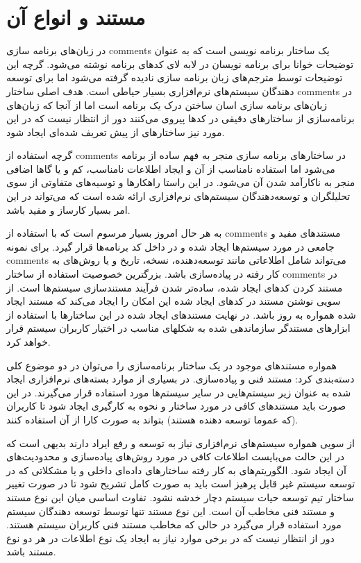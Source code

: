 
\section{مستند و انواع آن}

در زبان‌های برنامه سازی \glspl{comment} یک ساختار برنامه نویسی است که به عنوان
توضیحات خوانا برای برنامه نویسان در لابه لای کدهای برنامه نوشته می‌شود. گرچه این
توضیحات توسط مترجم‌های زبان برنامه سازی نادیده گرفته می‌شود اما برای توسعه
دهندگان سیستم‌های نرم‌افزاری بسیار حیاطی است. هدف اصلی ساختار \glspl{comment} در
زبان‌های برنامه سازی اسان ساختن درک یک برنامه است اما از آنجا که زبان‌های
برنامه‌سازی از ساختارهای دقیقی در کدها پیروی می‌کنند دور از انتظار نیست که در
این مورد نیز ساختارهای از پیش تعریف شده‌ای ایجاد شود.

گرچه استفاده از \glspl{comment} در ساختارهای برنامه سازی منجر به فهم ساده از
برنامه می‌شود اما استفاده نامناسب از آن و ایجاد اطلاعات نامناسب، کم و یا گاها
اضافی منجر به ناکارآمد شدن آن می‌شود. در این راستا راهکارها و توسیه‌های متفاوتی
از سوی تحلیلگران و توسعه‌دهندگان سیستم‌های نرم‌افزاری ارائه شده است که می‌تواند
در این امر بسیار کارساز و مفید باشد.

به هر حال امروز بسیار مرسوم است که با استفاده از \glspl{comment} مستندهای مفید و
جامعی در مورد سیستم‌ها ایجاد شده و در داخل کد برنامه‌ها قرار گیرد\cite{17wiki}.
برای نمونه \glspl{comment} می‌تواند شامل اطلاعاتی مانند توسعه‌دهنده، نسخه، تاریخ
و یا روش‌های به کار رفته در پیاده‌سازی باشد. بزرگترین خصوصیت استفاده از
ساختار \glspl{comment} در مستند کردن کدهای ایجاد شده، ساده‌تر شدن فرآیند
مستندسازی سیستم‌ها است. از سویی نوشتن مستند در کدهای ایجاد شده این امکان را
ایجاد می‌کند که مستند ایجاد شده همواره به روز باشد. در نهایت مستندهای ایجاد شده
در این ساختارها با استفاده از ابزارهای مستندگر سازماندهی شده به شکلهای مناسب در
اختیار کاربران سیستم قرار خواهد کرد.

همواره مستندهای موجود در یک ساختار برنامه‌سازی را می‌توان در دو موضوع کلی
دسته‌بندی کرد: مستند فنی و پیاده‌سازی. در بسیاری از موارد بسته‌های نرم‌افزاری
ایجاد شده به عنوان زیر سیستم‌هایی در سایر سیستم‌ها مورد استفاده قرار می‌گیرند.
در این صورت باید مستندهای کافی در مورد ساختار و نحوه به کارگیری ایجاد شود تا
کاربران (که عموما توسعه دهنده هستند) بتواند به صورت کارا از آن استفاده کنند.

از سویی همواره سیستم‌های نرم‌افزاری نیاز به توسعه و رفع ایراد دارند بدیهی است که
در این حالت می‌بایست اطلاعات کافی در مورد روش‌های پیاده‌سازی و محدودیت‌های آن
ایجاد شود. الگوریتم‌های به کار رفته ساختارهای داده‌ای داخلی و یا مشکلاتی که در
توسعه سیستم غیر قابل پرهیز است باید به صورت کامل تشریح شود تا در صورت تغییر
ساختار تیم توسعه حیات سیستم دچار خدشه نشود. تفاوت اساسی میان این نوع مستند و
مستند فنی مخاطب آن است. این نوع مستند تنها توسط توسعه دهندگان سیستم مورد استفاده
قرار می‌گیرد در حالی که مخاطب مستند فنی کاربران سیستم هستند. دور از انتظار نیست
که در برخی موارد نیاز به ایجاد یک نوع اطلاعات در هر دو نوع مستند باشد.

